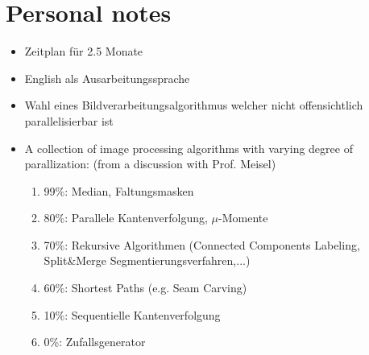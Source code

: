 \documentclass{article}
\newcommand{\note}[1]{{\tiny (#1)}}
\begin{document}
    \newpage
    
    
    \newpage
    
    \section{Personal notes}
    
    \begin{itemize}
        \item Zeitplan für 2.5 Monate
        \item English als Ausarbeitungssprache
        \item Wahl eines Bildverarbeitungsalgorithmus welcher nicht offensichtlich parallelisierbar ist
        \item A collection of image processing algorithms with varying degree of parallization: \note{from a discussion with Prof. Meisel}
            \begin{enumerate}
                \item 99\%: Median, Faltungsmasken
                \item 80\%: Parallele Kantenverfolgung, $\mu$-Momente
                \item 70\%: Rekursive Algorithmen (Connected Components Labeling, Split&Merge Segmentierungsverfahren,...)
                \item 60\%: Shortest Paths (e.g. Seam Carving)
                \item 10\%: Sequentielle Kantenverfolgung
                \item 0\%: Zufallsgenerator
            \end{enumerate}
    \end{itemize}
    
    
\end{document}
